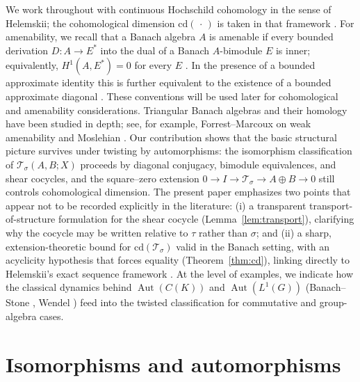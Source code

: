 \documentclass{article}
\theoremstyle{plain}
\theoremstyle{definition}
\newcommand{\T}{\mathcal{T}}
\newcommand{\Aut}{\operatorname{Aut}}
\begin{document}
We work throughout with continuous Hochschild cohomology in the sense of Helemskii; the cohomological dimension \(\mathrm{cd}(\,\cdot\,)\) is taken in that framework \cite[Sec.~5, Sec.~31]{HelemskiiHomology}.
For amenability, we recall that a Banach algebra \(A\) is amenable if every bounded derivation \(D:A\to E^*\) into the dual of a Banach \(A\)-bimodule \(E\) is inner; equivalently, \(H^1(A,E^*)=0\) for every \(E\) \cite{JohnsonMemoir}.
In the presence of a bounded approximate identity this is further equivalent to the existence of a bounded approximate diagonal \cite{JohnsonAJM}.
These conventions will be used later for cohomological and amenability considerations.
Triangular Banach algebras and their homology have been studied in depth; see, for example,
Forrest--Marcoux on weak amenability \cite{ForrestMarcouxWA} and Moslehian \cite{MoslehianTriangular}.
Our contribution shows that the basic structural picture survives under twisting by automorphisms:
the isomorphism classification of $\T_\sigma(A,B;X)$ proceeds by diagonal conjugacy, bimodule
equivalences, and shear cocycles, and the square--zero extension $0\to I\to \T_\sigma\to A\oplus B\to 0$
still controls cohomological dimension. The present paper emphasizes two points that appear not to
be recorded explicitly in the literature: (i) a transparent transport-of-structure formulation for the
shear cocycle (Lemma~\ref{lem:transport}), clarifying why the cocycle may be written relative to $\tau$
rather than $\sigma$; and (ii) a sharp, extension-theoretic bound for $\mathrm{cd}(\T_\sigma)$ valid in the
Banach setting, with an acyclicity hypothesis that forces equality (Theorem~\ref{thm:cd}),
linking directly to Helemskii's exact sequence framework \cite{HelemskiiHomology}.
At the level of examples, we indicate how the classical dynamics behind $\Aut(C(K))$ and
$\Aut(L^1(G))$ (Banach--Stone \cite{GillmanJerison}, Wendel \cite{Wendel}) feed into the twisted
classification for commutative and group-algebra cases.

\section{Isomorphisms and automorphisms}
\end{document}
